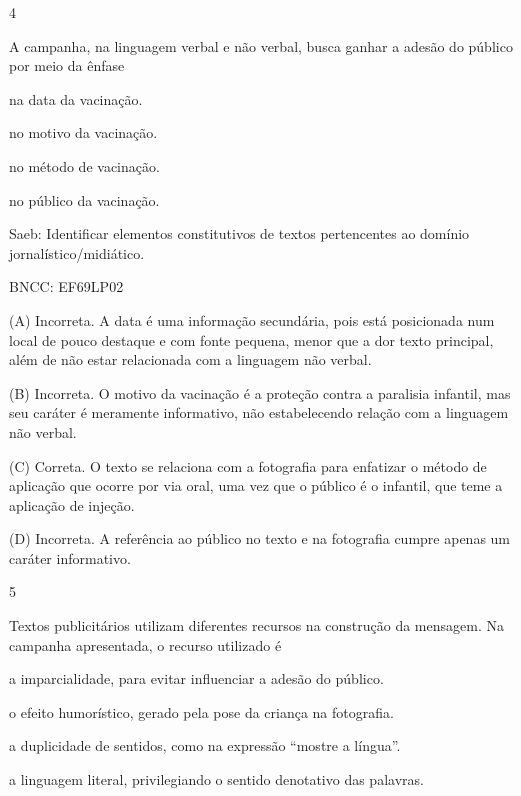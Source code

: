 
\num{4}

A campanha, na linguagem verbal e não verbal, busca ganhar a adesão do
público por meio da ênfase

\begin{escolha}
\item na data da vacinação.

\item no motivo da vacinação.

\item no método de vacinação.

\item no público da vacinação.
\end{escolha}

Saeb: Identificar elementos constitutivos de textos pertencentes ao
domínio jornalístico/midiático.

BNCC: EF69LP02

(A) Incorreta. A data é uma informação secundária, pois está posicionada
num local de pouco destaque e com fonte pequena, menor que a dor texto
principal, além de não estar relacionada com a linguagem não verbal.

(B) Incorreta. O motivo da vacinação é a proteção contra a paralisia
infantil, mas seu caráter é meramente informativo, não estabelecendo
relação com a linguagem não verbal.

(C) Correta. O texto se relaciona com a fotografia para enfatizar o
método de aplicação que ocorre por via oral, uma vez que o público é o
infantil, que teme a aplicação de injeção.

(D) Incorreta. A referência ao público no texto e na fotografia cumpre
apenas um caráter informativo.

\num{5}

Textos publicitários utilizam diferentes recursos na construção da
mensagem. Na campanha apresentada, o recurso utilizado é

\begin{escolha}
\item
a imparcialidade, para evitar influenciar a adesão do público.
\item
o efeito humorístico, gerado pela pose da criança na fotografia.
\item
a duplicidade de sentidos, como na expressão ``mostre a língua''.
\item
a linguagem literal, privilegiando o sentido denotativo das palavras.
\end{escolha}

